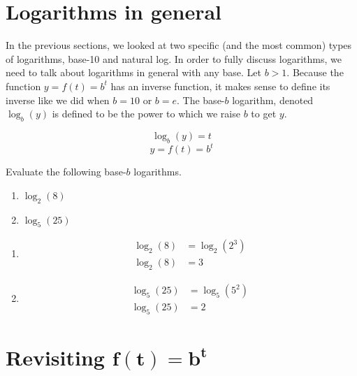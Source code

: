 \documentclass[nooutcomes]{ximera}
\begin{document}
%
%
%
\section{Logarithms in general}
 In the previous sections, we looked at two specific (and the most common) types of logarithms, base-10 and natural log. In order to fully discuss logarithms, we need to talk about logarithms in general with any base. Let $b>1$. Because the function $y=f(t)=b^t$ has an inverse function, it makes sense to define its inverse like we did when $b=10$ or $b=e$. The base-$b$ logarithm, denoted $\log_{b}(y)$ is defined to be the power to which we raise $b$ to get $y$. 

\[
\log_{b}(y)=t
\]
\[
y=f(t)=b^t
\]

\begin{example} Evaluate the following base-$b$ logarithms.
\begin{enumerate}
\item $\log_{2}(8)$
\item $\log_{5}(25)$
\end{enumerate}
\begin{explanation}
\begin{enumerate}
\item 
\begin{align*}
\log_{2}(8)&=\log_{2}(2^3)\\
\log_{2}(8)&= 3
\end{align*}

\item
\begin{align*} 
\log_{5}(25)&=\log_{5}(5^2)\\
\log_{5}(25) & = 2
\end{align*}

\end{enumerate}
\end{explanation}
\end{example}

%
%
%
\section{Revisiting $\mathbf{f(t) = b^t}$}
\end{document}
